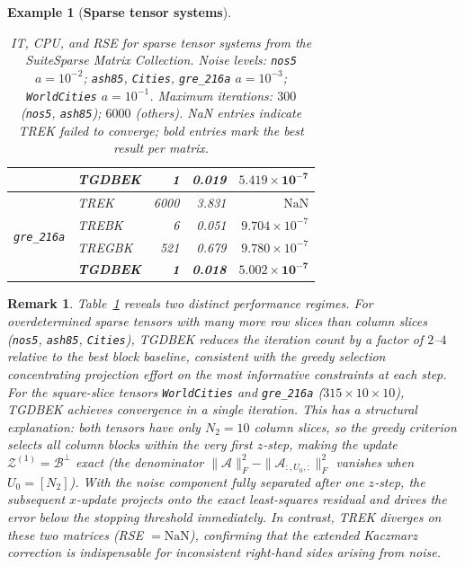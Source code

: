 \documentclass[11pt]{article}
\newtheorem{example}[theorem]{Example}
\newtheorem{remark}[theorem]{Remark}
\def\fm#1{\mathcal{#1}}
\begin{document}
\begin{example}[\textbf{Sparse tensor systems}]
\begin{table}[ht]
\begin{tabular}{llrrr}
  & \textbf{TGDBEK} &    \textbf{1} & \textbf{0.019} & $\mathbf{5.419\times10^{-7}}$ \\
\midrule
\multirow{4}{*}{\texttt{gre\_216a}}
  & TREK            & 6000 & 3.831 & $\mathrm{NaN}$ \\
  & TREBK           &    6 & 0.051 & $9.704\times10^{-7}$ \\
  & TREGBK          &  521 & 0.679 & $9.780\times10^{-7}$ \\
  & \textbf{TGDBEK} &    \textbf{1} & \textbf{0.018} & $\mathbf{5.002\times10^{-7}}$ \\
\bottomrule
\end{tabular}
\caption{IT, CPU, and RSE for sparse tensor systems from the SuiteSparse Matrix Collection.
Noise levels: \texttt{nos5} $a=10^{-2}$; \texttt{ash85}, \texttt{Cities}, \texttt{gre\_216a} $a=10^{-3}$; \texttt{WorldCities} $a=10^{-1}$.
Maximum iterations: $300$ (\texttt{nos5}, \texttt{ash85}); $6000$ (others).
NaN entries indicate TREK failed to converge; bold entries mark the best result per matrix.}
\label{tab:ex2}
\end{table}
\end{example}

\begin{remark}
Table~\ref{tab:ex2} reveals two distinct performance regimes. For overdetermined sparse tensors with many more row slices than column slices (\texttt{nos5}, \texttt{ash85}, \texttt{Cities}), TGDBEK reduces the iteration count by a factor of $2$--$4$ relative to the best block baseline, consistent with the greedy selection concentrating projection effort on the most informative constraints at each step. For the square-slice tensors \texttt{WorldCities} and \texttt{gre\_216a} ($315\times10\times10$), TGDBEK achieves convergence in a single iteration. This has a structural explanation: both tensors have only $N_2 = 10$ column slices, so the greedy criterion selects all column blocks within the very first $z$-step, making the update $\fm Z^{(1)} = \fm B^\perp$ exact (the denominator $\|\fm A\|_F^2 - \|\fm A_{:,U_0,:}\|_F^2$ vanishes when $U_0 = [N_2]$). With the noise component fully separated after one $z$-step, the subsequent $x$-update projects onto the exact least-squares residual and drives the error below the stopping threshold immediately. In contrast, TREK diverges on these two matrices (RSE $= \mathrm{NaN}$), confirming that the extended Kaczmarz correction is indispensable for inconsistent right-hand sides arising from noise.
\end{remark}
\end{document}
